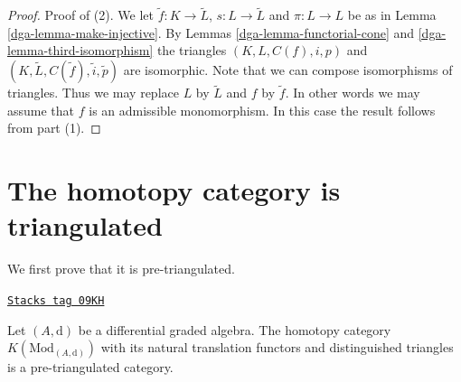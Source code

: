 \begin{proof}
\medskip\noindent
Proof of (2). We let $\tilde f : K \to \tilde L$,
$s : L \to \tilde L$
and $\pi : L \to L$ be as in
Lemma \ref{dga-lemma-make-injective}. By
Lemmas \ref{dga-lemma-functorial-cone} and \ref{dga-lemma-third-isomorphism}
the triangles $(K, L, C(f), i, p)$ and
$(K, \tilde L, C(\tilde f), \tilde i, \tilde p)$
are isomorphic. Note that we can compose isomorphisms of
triangles. Thus we may replace $L$ by
$\tilde L$ and $f$ by $\tilde f$. In other words
we may assume that $f$ is an admissible monomorphism.
In this case the result follows from part (1).
\end{proof}

\section{The homotopy category is triangulated}
\label{dga-section-homotopy-triangulated}
We first prove that it is pre-triangulated.

\begin{lemma}
\label{dga-lemma-homotopy-category-pre-triangulated}
\href{https://stacks.math.columbia.edu/tag/09KH}{\texttt{Stacks tag 09KH}}

Let $(A, \text{d})$ be a differential graded algebra.
The homotopy category $K(\text{Mod}_{(A, \text{d})})$
with its natural translation functors and distinguished triangles
is a pre-triangulated category.
\end{lemma}


